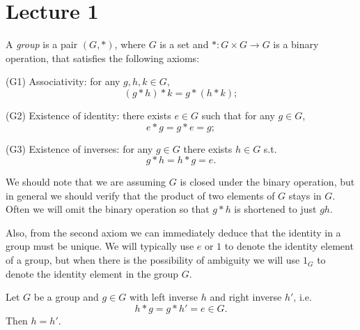 \section{Lecture 1} 
\begin{definition}
  A \emph{group} is a pair $(G,*)$, where $G$ is a set and $*:G\times G\to G$ is a binary
  operation, that satisfies the following axioms:
  
       (G1) Associativity: for any $g,h,k\in G$,
      \[(g*h)*k = g*(h*k);\]
      
       (G2)  Existence of identity: there exists $e\in G$ such that for any $g\in G$,
      \[e*g=g*e = g;\]
      
       (G3) Existence of inverses: for any $g\in G$ there exists $h\in G$ s.t. 
      \[g*h=h*g=e.\]
  
  \label{group}
\end{definition}

We should note that we are assuming $G$ is closed under the binary operation, but 
in general we should verify that the product of two elements of $G$ stays in $G$. Often we will omit the binary operation so that $g*h$ is shortened to just $gh$. 

Also, from the second axiom we can immediately deduce that the identity in a group must be unique. We will typically use $e$ or $1$ to denote the identity element of a group, but when there is the possibility of ambiguity we will use $1_{G}$ to denote the identity element in the group $G$.


\begin{theorem}
    Let $G$ be a group and $g \in G$ with left inverse $h$ and right inverse $h'$, i.e. $$h*g = g*h'=e \in G.$$ Then $h=h'$. 
\end{theorem}

